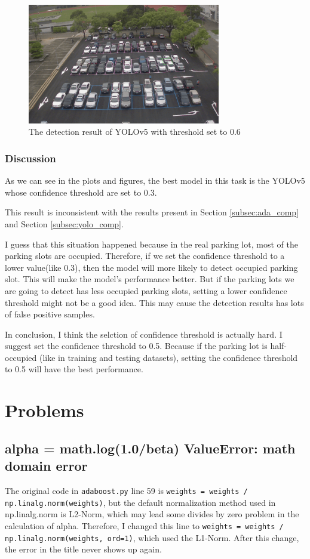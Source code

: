 \documentclass{article}[12pt, twocolumn]
\begin{document}
\begin{figure}[H]
    \centering
    \includegraphics[width=0.75\textwidth]{figure/Yolov5_first_frame_6.png}
    \caption{The detection result of YOLOv5 with threshold set to 0.6}
\end{figure}

\subsubsection{Discussion}

As we can see in the plots and figures, the best model in this task is
the YOLOv5 whose confidence threshold are set to 0.3.

This result is inconsistent with the results present in 
Section \ref{subsec:ada_comp} and Section \ref{subsec:yolo_comp}. 

I guess that this situation happened because in the real parking lot, 
most of the parking slots are occupied. 
Therefore, if we set the confidence threshold to a lower value(like 0.3), then the model 
will more likely to detect occupied parking slot. This will make the model's performance better.
But if the parking lots we are going to detect has less occupied parking slots,
setting a lower confidence threshold might not be a good idea. This may cause the detection results 
has lots of false positive samples.

In conclusion, I think the selction of confidence threshold is actually hard. I suggest set
the confidence threshold to 0.5. Because if the parking lot is half-occupied (like in training 
and testing datasets), setting the confidence threshold to 0.5 will have the best performance.


\section{Problems}
\subsection{alpha = math.log(1.0/beta) ValueError: math domain error}
The original code in \texttt{adaboost.py} line 59 is 
\texttt{weights = weights / np.linalg.norm(weights)},
but the default normalization method used in np.linalg.norm is L2-Norm, 
which may lead some divides by zero problem in the calculation of alpha.
Therefore, I changed this line to \texttt{weights = weights / np.linalg.norm(weights, ord=1)}, 
which used the L1-Norm. After this change, the error in the title never shows up again.
\end{document}
